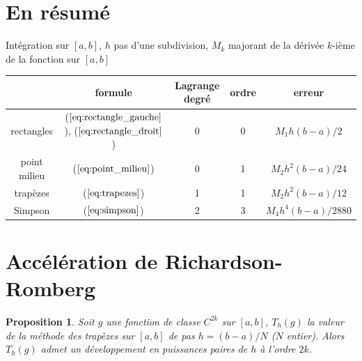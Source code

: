 \documentclass[a4paper,11pt]{book}
\newtheorem{prop}[thm]{Proposition}
\begin{document}
\begin{giacjshere}
\section{En r\'esum\'e}
Int\'egration sur $[a,b]$, $h$ pas d'une subdivision, $M_k$ majorant
de la d\'eriv\'ee $k$-i\`eme de la fonction sur $[a,b]$\\
\begin{tabular}{|c|c|c|c|c|} \hline 
 & formule & Lagrange degr\'e & ordre & erreur \\ \hline
rectangles & (\(\ref{eq:rectangle_gauche}\)), (\(\ref{eq:rectangle_droit}\)) & 0 & 0 & $M_1 h (b-a)/2$ \\
point milieu & (\(\ref{eq:point_milieu}\)) & 0 & 1 & $M_2 h^2 (b-a)/24$ \\
trap\`ezes & (\(\ref{eq:trapezes}\)) & 1 & 1 & $M_2 h^2 (b-a)/12$ \\
Simpson & (\(\ref{eq:simpson}\))& 2 & 3 & $M_4 h^4 (b-a)/2880$  \\ \hline
\end{tabular}

\section{Accélération de Richardson-Romberg}
\begin{prop}
Soit $g$ une fonction de classe $C^{2k}$ sur $[a,b]$, 
$T_h(g)$ la valeur de la méthode des trapèzes sur $[a,b]$ de pas 
$h=(b-a)/N$ ($N$ entier).
Alors $T_h(g)$ admet un développement en puissances paires de $h$
à l'ordre $2k$.
\end{prop}


\end{giacjshere}
\end{document}
